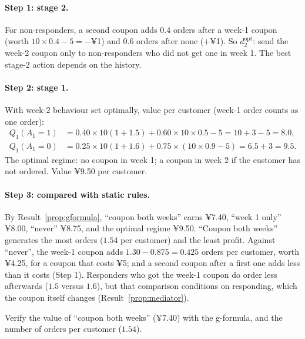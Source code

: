 \documentclass[11pt]{article}
\begin{document}
\paragraph{Step 1: stage 2.} For non-responders, a second coupon adds $0.4$ orders after a week-1 coupon (worth
$10 \times 0.4 - 5 = -$¥1) and $0.6$ orders after none ($+$¥1). So $d_2^{\text{opt}}$: send the week-2 coupon only to non-responders who
did not get one in week 1. The best stage-2 action depends on the history.

\paragraph{Step 2: stage 1.} With week-2 behaviour set optimally, value per customer (week-1 order counts as one order):
\begin{align*}
  Q_1(A_1 = 1) &= 0.40 \times 10(1 + 1.5) + 0.60 \times 10 \times 0.5 - 5 = 10 + 3 - 5 = 8.0, \\
  Q_1(A_1 = 0) &= 0.25 \times 10(1 + 1.6) + 0.75 \times (10 \times 0.9 - 5) = 6.5 + 3 = 9.5 .
\end{align*}
The optimal regime: no coupon in week 1; a coupon in week 2 if the customer has not ordered. Value ¥9.50 per customer.

\paragraph{Step 3: compared with static rules.} By Result~\ref{prop:gformula}, ``coupon both weeks'' earns ¥7.40, ``week 1 only'' ¥8.00,
``never'' ¥8.75, and the optimal regime ¥9.50. ``Coupon both weeks'' generates the most orders ($1.54$ per customer) and the least
profit. Against ``never'', the week-1 coupon adds $1.30 - 0.875 = 0.425$ orders per customer, worth ¥4.25, for a coupon that costs
¥5; and a second coupon after a first one adds less than it costs (Step 1). Responders who got the week-1 coupon do order less
afterwards ($1.5$ versus $1.6$), but that comparison conditions on responding, which the coupon itself changes
(Result~\ref{prop:mediator}).

\begin{exercise}[computation]
Verify the value of ``coupon both weeks'' (¥7.40) with the g-formula, and the number of orders per customer ($1.54$).
\end{exercise}
\end{document}
